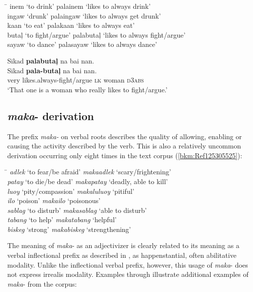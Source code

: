 \ea
\begin{tabbing} 
\hspace{3.5cm} \= \kill
inem  ‘to drink’ \> palainem  ‘likes to always drink’ \\
ingaw  ‘drunk’ \>   palaingaw  ‘likes to always get drunk’ \\
kaan  ‘to eat’  \>  palakaan  ‘likes to always eat’ \\
butaļ  ‘to fight/argue’ \> palabutaļ  ‘likes to always fight/argue’ \\
sayaw  ‘to dance’ \> palasayaw  ‘likes to always dance’
\end{tabbing}
\z
\ea
\label{bkm:Ref439853390}
Sikad  \textbf{palabutaļ}  na  bai  nan. \\\smallskip
 \gll Sikad  \textbf{pala-butaļ}  na  bai  nan. \\
very  likes.always-fight/argue  \textsc{lk}  woman  \textsc{d}3\textsc{abs} \\
\glt ‘That one is a woman who really likes to fight/argue.’
\z
\subsection{\textit{maka}{}- derivation}
\label{sec:maka-derivation}

The prefix \textit{maka-} on verbal roots describes the quality of allowing, enabling or causing the activity described by the verb. This is also a relatively uncommon derivation occurring only eight times in the text corpus (\ref{bkm:Ref125305525}):

\ea
\label{bkm:Ref125305525}
\begin{tabbing}
\hspace{4cm} \= \kill
\textit{adlek} ‘to fear/be afraid’ \> \textit{makaadlek} ‘scary/frightening’ \\
\textit{patay} ‘to die/be dead’ \> \textit{makapatay} ‘deadly, able to kill’ \\
\textit{luoy} ‘pity/compassion’ \> \textit{makaluluoy} ‘pitiful’ \\
\textit{ilo} ‘poison'   \>   \textit{makailo} ‘poisonous’ \\
\textit{sablag} ‘to disturb’ \> \textit{makasablag} ‘able to disturb’ \\
\textit{tabang} ‘to help’  \>  \textit{makatabang} ‘helpful’ \\
\textit{biskeg} ‘strong’  \>  \textit{makabiskeg} ‘strengthening’
\end{tabbing}
\z

The meaning of \textit{maka}{}- as an adjectivizer is clearly related to its meaning as a verbal inflectional prefix as described in ,  as happenstantial, often abilitative modality. Unlike the inflectional verbal prefix, however, this usage of \textit{maka}{}- does not express irrealis modality.  Examples  through  illustrate additional examples of \textit{maka}{}- from the corpus:

